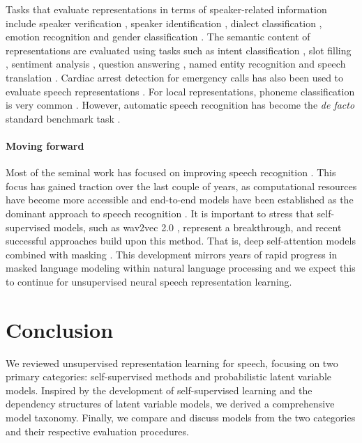 {Tasks that evaluate representations in terms of speaker-related information include speaker verification \cite{hsu_unsupervised_2017, khurana_factorial_2019, milde_unspeech_2018}, speaker identification \cite{oord_representation_2018, jati_neural_2019, chung_unsupervised_2019, liu_nonautoregressive_2020}, dialect classification \cite{khurana_factorial_2019}, emotion recognition \cite{pascual_learning_2019, yang_superb_2021} and gender classification \cite{lee_unsupervised_2009}. The semantic content of representations are evaluated using tasks such as intent classification \cite{morais_endtoend_2021, yang_superb_2021}, slot filling \cite{lai_semisupervised_2021, yang_superb_2021}, sentiment analysis \cite{liu_mockingjay_2020}, question answering \cite{chung_splat_2021}, named entity recognition \cite{shon_slue_2021, borgholt_we_2021, pasad_use_2022} and speech translation \cite{bansal_speechtotext_2017, chung_generative_2020}. Cardiac arrest detection for emergency calls has also been used to evaluate speech representations \cite{borgholt_we_2021}.
For local representations, phoneme classification is very common \cite{lee_unsupervised_2009, hsu_learning_2017, chorowski_unsupervised_2019, chung_unsupervised_2019, liu_tera_2021}.
However, automatic speech recognition has become the \textit{de facto} standard benchmark task \cite{ling_decoar_2020, chung_generative_2020, hsu_hubert_2021}.

\paragraph{Moving forward} 
Most of the seminal work has focused on improving speech recognition \cite{schneider_wav2vec_2019, baevski_wav2vec_2020}. This focus has gained traction over the last couple of years, as computational resources have become more accessible and end-to-end models \cite{graves_connectionist_2006, chan_listen_2015} have been established as the dominant approach to speech recognition \cite{gulati_conformer_2020}. It is important to stress that self-supervised models, such as wav2vec 2.0 \cite{baevski_wav2vec_2020}, represent a breakthrough, and recent successful approaches build upon this method. That is, deep self-attention models combined with masking \cite{hsu_hubert_2021, wang_unispeech_2021, chen_wavlm_2021}. This development mirrors years of rapid progress in masked language modeling within natural language processing \cite{devlin_bert_2018,clark_electra_2020} and we expect this to continue for unsupervised neural speech representation learning.

\section{Conclusion}
\label{sec:conc}
We reviewed unsupervised representation learning for speech, focusing on two primary categories: self-supervised methods and probabilistic latent variable models. Inspired by the development of self-supervised learning and the dependency structures of latent variable models, we derived a comprehensive model taxonomy. Finally, we compare and discuss models from the two categories and their respective evaluation procedures.

}
